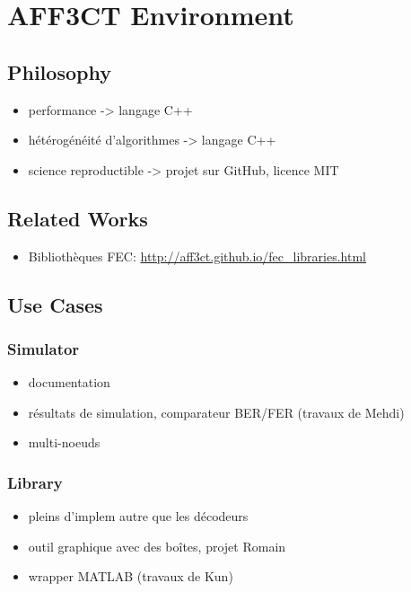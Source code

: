 \chapter{AFF3CT Environment~\cite{Cassagne2017a,Cassagne2017,Cassagne2019a}}

\section{Philosophy}

\begin{itemize}
  \item performance -> langage C++
  \item hétérogénéité d'algorithmes -> langage C++
  \item science reproductible -> projet sur GitHub, licence MIT
\end{itemize}

\section{Related Works}

\begin{itemize}
  \item Bibliothèques FEC: \url{http://aff3ct.github.io/fec_libraries.html}
\end{itemize}

\section{Use Cases}

\subsection{Simulator}

\begin{itemize}
  \item documentation
  \item résultats de simulation, comparateur BER/FER (travaux de Mehdi)
  \item multi-noeuds
\end{itemize}

\subsection{Library}

\begin{itemize}
  \item pleins d'implem autre que les décodeurs
  \item outil graphique avec des boîtes, projet Romain
  \item wrapper MATLAB (travaux de Kun)
\end{itemize}


